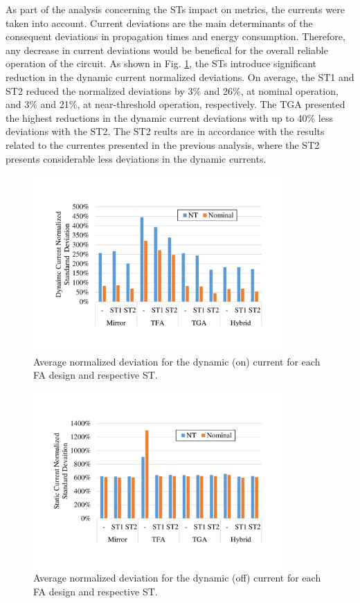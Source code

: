 \documentclass[pgmicro,diss,english]{iiufrgs}
\begin{document}
As part of the analysis concerning the STs impact on metrics, the currents were taken into account. Current deviations are the main determinants of the consequent deviations in propagation times and energy consumption. Therefore, any decrease in current deviations would be benefical for the overall reliable operation of the circuit. As shown in Fig. \ref{fig:onCurrDevFA}, the STs introduce significant reduction in the dynamic current normalized deviations. On average, the ST1 and ST2 reduced the normalized deviations by 3\% and 26\%, at nominal operation, and 3\% and 21\%, at near-threshold operation, respectively. The TGA presented the highest reductions in the dynamic current deviations with up to 40\% less deviations with the ST2. The ST2 reults are in accordance with the results related to the currentes presented in the previous analysis, where the ST2 presents considerable less deviations in the dynamic currents.

\begin{figure}[t]
  \centering
    \includegraphics[width=0.85\textwidth, trim={2cm 3cm 2cm 3cm}, clip]{onCurrDev.pdf}
     \caption{Average normalized deviation for the dynamic (on) current for each FA design and respective ST.}
  \label{fig:onCurrDevFA}
\end{figure}

\begin{figure}[h]
  \centering
    \includegraphics[width=0.85\textwidth, trim={2cm 3cm 2cm 3cm}, clip]{offCurrDev.pdf}
     \caption{Average normalized deviation for the dynamic (off) current for each FA design and respective ST.}
  \label{fig:offCurrDevFA}
\end{figure}
\end{document}
